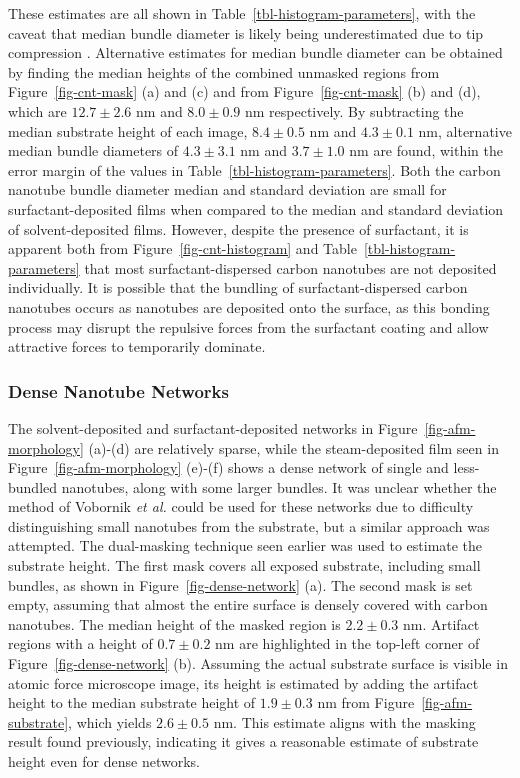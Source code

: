 \documentclass[
  a4paper,
]{scrbook}
\begin{document}
These estimates are all shown in Table~\ref{tbl-histogram-parameters},
with the caveat that median bundle diameter is likely being
underestimated due to tip compression \autocite{Vobornik2023}.
Alternative estimates for median bundle diameter can be obtained by
finding the median heights of the combined unmasked regions from
Figure~\ref{fig-cnt-mask} (a) and (c) and from Figure~\ref{fig-cnt-mask}
(b) and (d), which are \(12.7 \pm 2.6\) nm and \(8.0 \pm 0.9\) nm
respectively. By subtracting the median substrate height of each image,
\(8.4 \pm 0.5\) nm and \(4.3 \pm 0.1\) nm, alternative median bundle
diameters of \(4.3 \pm 3.1\) nm and \(3.7 \pm 1.0\) nm are found, within
the error margin of the values in Table~\ref{tbl-histogram-parameters}.
Both the carbon nanotube bundle diameter median and standard deviation
are small for surfactant-deposited films when compared to the median and
standard deviation of solvent-deposited films. However, despite the
presence of surfactant, it is apparent both from
Figure~\ref{fig-cnt-histogram} and Table~\ref{tbl-histogram-parameters}
that most surfactant-dispersed carbon nanotubes are not deposited
individually. It is possible that the bundling of surfactant-dispersed
carbon nanotubes occurs as nanotubes are deposited onto the surface, as
this bonding process may disrupt the repulsive forces from the
surfactant coating and allow attractive forces to temporarily dominate.

\hypertarget{dense-nanotube-networks}{%
\subsubsection*{Dense Nanotube Networks}\label{dense-nanotube-networks}}

The solvent-deposited and surfactant-deposited networks in
Figure~\ref{fig-afm-morphology} (a)-(d) are relatively sparse, while the
steam-deposited film seen in Figure~\ref{fig-afm-morphology} (e)-(f)
shows a dense network of single and less-bundled nanotubes, along with
some larger bundles. It was unclear whether the method of Vobornik
\emph{et al.} could be used for these networks due to difficulty
distinguishing small nanotubes from the substrate, but a similar
approach was attempted. The dual-masking technique seen earlier was used
to estimate the substrate height. The first mask covers all exposed
substrate, including small bundles, as shown in
Figure~\ref{fig-dense-network} (a). The second mask is set empty,
assuming that almost the entire surface is densely covered with carbon
nanotubes. The median height of the masked region is \(2.2 \pm 0.3\) nm.
Artifact regions with a height of \(0.7 \pm 0.2\) nm are highlighted in
the top-left corner of Figure~\ref{fig-dense-network} (b). Assuming the
actual substrate surface is visible in atomic force microscope image,
its height is estimated by adding the artifact height to the median
substrate height of \(1.9 \pm 0.3\) nm from
Figure~\ref{fig-afm-substrate}, which yields \(2.6 \pm 0.5\) nm. This
estimate aligns with the masking result found previously, indicating it
gives a reasonable estimate of substrate height even for dense networks.
\end{document}
